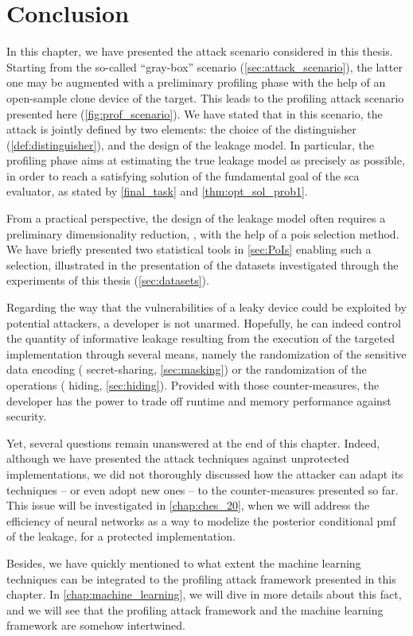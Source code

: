 \section{Conclusion}
    In this chapter, we have presented the attack scenario considered in this thesis.
    Starting from the so-called ``gray-box'' scenario (\autoref{sec:attack_scenario}), the latter one may be augmented with a preliminary profiling phase with the help of an open-sample clone device of the target.
    This leads to the profiling attack scenario presented here (\autoref{fig:prof_scenario}).
    We have stated that in this scenario, the attack is jointly defined by two elements: the choice of the distinguisher (\autoref{def:distinguisher}), and the design of the leakage model.
    In particular, the profiling phase aims at estimating the true leakage model as precisely as possible, in order to reach a satisfying solution of the fundamental goal of the \gls{sca} evaluator, as stated by \autoref{final_task} and \autoref{thm:opt_sol_prob1}.

    From a practical perspective, the design of the leakage model often requires a preliminary dimensionality reduction, \eg{}, with the help of a \glspl{poi} selection method.
    We have briefly presented two statistical tools in \autoref{sec:PoIs} enabling such a selection, illustrated in the presentation of the datasets investigated through the experiments of this thesis (\autoref{sec:datasets}).

    Regarding the way that the vulnerabilities of a leaky device could be exploited by potential attackers, a developer is not unarmed.
    Hopefully, he can indeed control the quantity of informative leakage resulting from the execution of the targeted implementation through several means, namely the randomization of the sensitive data encoding (\aka{} secret-sharing, \autoref{sec:masking}) or the randomization of the operations (\aka{} hiding, \autoref{sec:hiding}).
    Provided with those counter-measures, the developer has the power to trade off runtime and memory performance against security.

    Yet, several questions remain unanswered at the end of this chapter.
    Indeed, although we have presented the attack techniques against unprotected implementations, we did not thoroughly discussed how the attacker can adapt its techniques -- or even adopt new ones -- to the counter-measures presented so far.
    This issue will be investigated in \autoref{chap:ches_20}, when we will address the efficiency of neural networks as a way to modelize the posterior conditional \gls{pmf} of the leakage, for a protected implementation.

    Besides, we have quickly mentioned to what extent the machine learning techniques can be integrated to the profiling attack framework presented in this chapter.
    In \autoref{chap:machine_learning}, we will dive in more details about this fact, and we will see that the profiling attack framework and the machine learning framework are somehow intertwined.